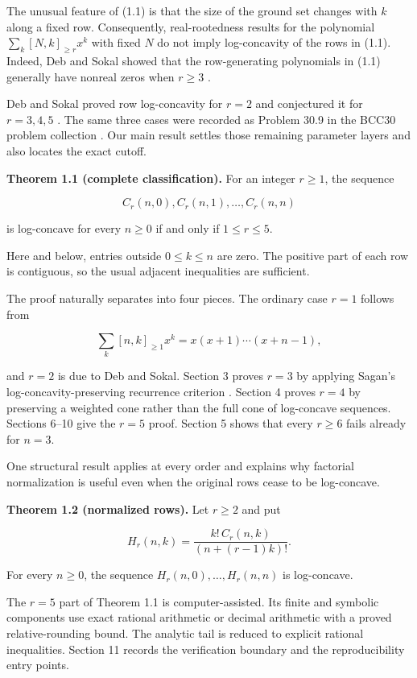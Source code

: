 \documentclass[11pt]{article}
\numberwithin{equation}{section}
\begin{document}
The unusual feature of (1.1) is that the size of the ground set changes with $k$ along a
fixed row. Consequently, real-rootedness results for the polynomial
$\sum_k[N,k]_{\ge r}x^k$ with fixed $N$ do not imply log-concavity of the rows in (1.1).
Indeed, Deb and Sokal showed that the row-generating polynomials in (1.1) generally have
nonreal zeros when $r\ge3$ \cite{deb-sokal}.

Deb and Sokal proved row log-concavity for $r=2$ and conjectured it for $r=3,4,5$
\cite[Conjecture 1.3(c)]{deb-sokal}. The same three cases were recorded as Problem 30.9 in the BCC30
problem collection \cite{bcc30}. Our main result settles those remaining parameter layers and also
locates the exact cutoff.

\textbf{Theorem 1.1 (complete classification).} For an integer $r\ge1$, the sequence

\[
C_r(n,0),C_r(n,1),\ldots,C_r(n,n)
\]

is log-concave for every $n\ge0$ if and only if $1\le r\le5$.

Here and below, entries outside $0\le k\le n$ are zero. The positive part of each row is
contiguous, so the usual adjacent inequalities are sufficient.

The proof naturally separates into four pieces. The ordinary case $r=1$ follows from

\[
\sum_k [n,k]_{\ge1}x^k=x(x+1)\cdots(x+n-1),
\]

and $r=2$ is due to Deb and Sokal. Section 3 proves $r=3$ by applying Sagan's
log-concavity-preserving recurrence criterion \cite{sagan}. Section 4 proves $r=4$ by preserving a
weighted cone rather than the full cone of log-concave sequences. Sections 6--10 give the
$r=5$ proof. Section 5 shows that every $r\ge6$ fails already for $n=3$.

One structural result applies at every order and explains why factorial normalization is
useful even when the original rows cease to be log-concave.

\textbf{Theorem 1.2 (normalized rows).} Let $r\ge2$ and put

\[
H_r(n,k)=\frac{k!\,C_r(n,k)}{(n+(r-1)k)!}.
\tag{1.2}
\]

For every $n\ge0$, the sequence $H_r(n,0),\ldots,H_r(n,n)$ is log-concave.

The $r=5$ part of Theorem 1.1 is computer-assisted. Its finite and symbolic components use
exact rational arithmetic or decimal arithmetic with a proved relative-rounding bound. The analytic tail is
reduced to explicit rational inequalities. Section 11 records the verification boundary and
the reproducibility entry points.
\end{document}
